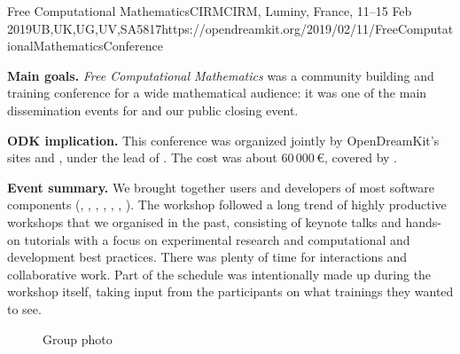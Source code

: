 \begin{event}{Free Computational Mathematics}{CIRM}{CIRM, Luminy, France, 11--15 Feb 2019}{UB,UK,UG,UV,SA}{58}{17}{https://opendreamkit.org/2019/02/11/FreeComputationalMathematicsConference}

\textbf{Main goals.} \emph{Free Computational Mathematics} was
a community building and training conference for a wide mathematical audience:
it was one of the main dissemination events for \ODK and our public closing event.

\textbf{ODK implication.} This conference was organized jointly by
OpenDreamKit's sites  and , under the lead of .
The cost was about 60\,000\,\euro, covered by .

\textbf{Event summary.}
We brought together users and developers of most \ODK software components
(\GAP, \Jupyter, \Linbox, \MPIR, \PariGP, \Sage, \Singular).
The workshop followed a long trend of highly productive workshops that we organised in the past,
consisting of keynote talks and hands-on tutorials with a focus on experimental research
and computational and development best practices.
There was plenty of time for interactions and collaborative work.
Part of the schedule was intentionally made up during the workshop itself,
taking input from the participants on what trainings they wanted to see.



\begin{figure}[ht]
\caption*{Group photo}
\end{figure}

\end{event}
